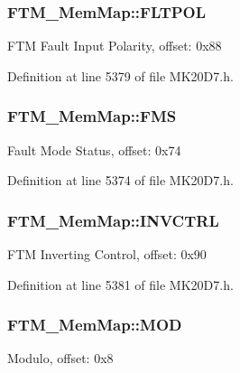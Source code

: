 \subsubsection[{\texorpdfstring{F\+L\+T\+P\+OL}{FLTPOL}}]{ F\+T\+M\+\_\+\+Mem\+Map\+::\+F\+L\+T\+P\+OL}\hypertarget{struct_f_t_m___mem_map_a0ed846091be8a3e998d93d2bc45f78dd}{}\label{struct_f_t_m___mem_map_a0ed846091be8a3e998d93d2bc45f78dd}
F\+TM Fault Input Polarity, offset\+: 0x88 

Definition at line 5379 of file M\+K20\+D7.\+h.

\subsubsection[{\texorpdfstring{F\+MS}{FMS}}]{ F\+T\+M\+\_\+\+Mem\+Map\+::\+F\+MS}\hypertarget{struct_f_t_m___mem_map_a7240bf4b5ae452ac8b2beb8c6f26833c}{}\label{struct_f_t_m___mem_map_a7240bf4b5ae452ac8b2beb8c6f26833c}
Fault Mode Status, offset\+: 0x74 

Definition at line 5374 of file M\+K20\+D7.\+h.

\subsubsection[{\texorpdfstring{I\+N\+V\+C\+T\+RL}{INVCTRL}}]{ F\+T\+M\+\_\+\+Mem\+Map\+::\+I\+N\+V\+C\+T\+RL}\hypertarget{struct_f_t_m___mem_map_afd87045c28b90c41492f23d268554433}{}\label{struct_f_t_m___mem_map_afd87045c28b90c41492f23d268554433}
F\+TM Inverting Control, offset\+: 0x90 

Definition at line 5381 of file M\+K20\+D7.\+h.

\subsubsection[{\texorpdfstring{M\+OD}{MOD}}]{ F\+T\+M\+\_\+\+Mem\+Map\+::\+M\+OD}\hypertarget{struct_f_t_m___mem_map_a5ad801f060851969c07a2c3f3a108ade}{}\label{struct_f_t_m___mem_map_a5ad801f060851969c07a2c3f3a108ade}
Modulo, offset\+: 0x8 

